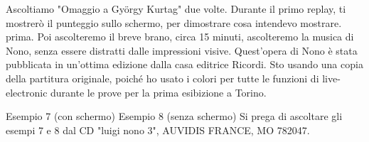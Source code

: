 Ascoltiamo "Omaggio a György Kurtag" due volte. Durante il primo replay, ti mostrerò il punteggio sullo schermo, per dimostrare cosa intendevo mostrare. prima. Poi ascolteremo il breve brano, circa 15 minuti, ascolteremo la musica di Nono, senza essere distratti dalle impressioni visive. Quest'opera di Nono è stata pubblicata in un'ottima edizione dalla casa editrice Ricordi. Sto usando una copia della partitura originale, poiché ho usato i colori per tutte le funzioni di live-electronic durante le prove per la prima esibizione a Torino.

Esempio 7 (con schermo)
Esempio 8 (senza schermo) Si prega di ascoltare gli esempi 7 e 8 dal CD "luigi nono 3", AUVIDIS FRANCE, MO 782047.
